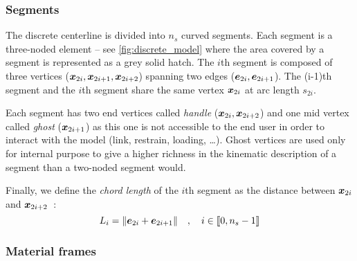 \subsubsection{Segments}
The discrete centerline is divided into $n_s$ curved segments. Each segment is a three-noded element -- see \cref{fig:discrete_model} where the area covered by a segment is represented as a grey solid hatch. The $i$th segment is composed of three vertices ($\boldsymbol{x}_{2i}, \boldsymbol{x}_{2i+1},  \boldsymbol{x}_{2i+2}$) spanning two edges ($\boldsymbol{e}_{2i}, \boldsymbol{e}_{2i+1}$). The (i-1)th segment and the $i$th segment share the same vertex $\boldsymbol{x}_{2i}$ at arc length $s_{2i}$.

Each segment has two end vertices called \emph{handle} ($\boldsymbol{x}_{2i}, \boldsymbol{x}_{2i+2}$) and one mid vertex called \emph{ghost} ($\boldsymbol{x}_{2i+1}$) as this one is not accessible to the end user in order to interact with the model (link, restrain, loading, \dots). Ghost vertices are used only for internal purpose to give a higher richness in the kinematic description of a segment than a two-noded segment would.

Finally, we define the \emph{chord length} of the $i$th segment as the distance between $\boldsymbol{x}_{2i}$ and $\boldsymbol{x}_{2i+2}$~:
\begin{equation}
	L_i = \lVert\boldsymbol{e}_{2i} + \boldsymbol{e}_{2i+1}\rVert \quad , \quad i \in \llbracket 0, n_s-1 \rrbracket
\end{equation}

\subsubsection{Material frames}

